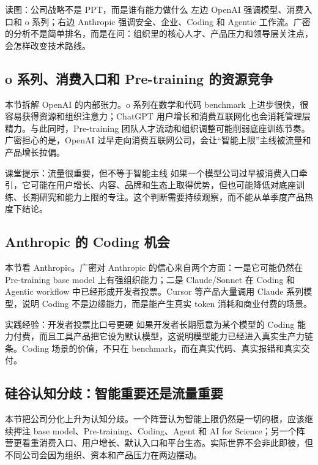 \documentclass[a4paper]{article}
\begin{document}
\begin{knowledgebox}{读图：公司战略不是 PPT，而是谁有能力做什么}
左边 OpenAI 强调模型、消费入口和 o 系列；右边 Anthropic 强调安全、企业、Coding 和 Agentic 工作流。广密的分析不是简单排名，而是在问：组织里的核心人才、产品压力和领导层关注点，会怎样改变技术路线。
\end{knowledgebox}

\subsection{o 系列、消费入口和 Pre-training 的资源竞争}

本节拆解 OpenAI 的内部张力。o 系列在数学和代码 benchmark 上进步很快，很容易获得资源和组织注意力；ChatGPT 用户增长和消费互联网化也会消耗管理层精力。与此同时，Pre-training 团队人才流动和组织调整可能削弱底座训练节奏。广密担心的是，OpenAI 过早走向消费互联网公司，会让“智能上限”主线被流量和产品增长拉偏。

\begin{warningbox}{课堂提示：流量很重要，但不等于智能主线}
如果一个模型公司过早被消费入口牵引，它可能在用户增长、内容、品牌和生态上取得优势，但也可能降低对底座训练、长期研究和能力上限的专注。这个判断需要持续观察，而不能从单季度产品热度下结论。
\end{warningbox}

\subsection{Anthropic 的 Coding 机会}

本节看 Anthropic。广密对 Anthropic 的信心来自两个方面：一是它可能仍然在 Pre-training base model 上有强组织能力；二是 Claude/Sonnet 在 Coding 和 Agentic workflow 中已经形成开发者投票。Cursor 等产品大量调用 Claude 系列模型，说明 Coding 不是边缘能力，而是能产生真实 token 消耗和商业付费的场景。

\begin{importantbox}{实践经验：开发者投票比口号更硬}
如果开发者长期愿意为某个模型的 Coding 能力付费，而且工具产品把它设为默认模型，这说明模型能力已经进入真实生产力链条。Coding 场景的价值，不只在 benchmark，而在真实代码、真实报错和真实交付。
\end{importantbox}

\subsection{硅谷认知分歧：智能重要还是流量重要}

本节把公司分化上升为认知分歧。一个阵营认为智能上限仍然是一切的根，应该继续押注 base model、Pre-training、Coding、Agent 和 AI for Science；另一个阵营更看重消费入口、用户增长、默认入口和平台生态。实际世界不会非此即彼，但不同公司会因为组织、资本和产品压力在两边摆动。
\end{document}
